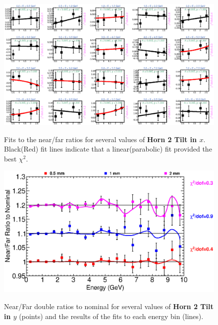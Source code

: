 \begin{figure}[ht]
  \begin{center}
    {\includegraphics[width=5.0in]{figures/Horn2XTilt_nof_fits.eps}}
  \end{center}
\caption{ Fits to the near/far ratios for several values of {\bf Horn 2 Tilt in $x$}. Black(Red) fit lines indicate that a linear(parabolic) fit provided the best $\chi^2$. }
\end{figure}

\begin{figure}[ht]
  \begin{center}
    {\includegraphics[width=6.0in]{figures/Horn2YTilt_nof_summary.eps}}
  \end{center}
\caption{ Near/Far double ratios to nominal for several values of {\bf Horn 2 Tilt in $y$} (points) and the results of the fits to each energy bin (lines).}
\end{figure}

